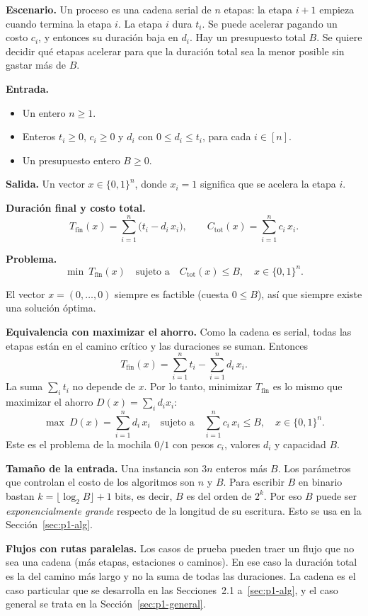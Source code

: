 \documentclass[11pt,a4paper]{article}
\theoremstyle{definition}
\newcommand{\Tfin}{T_{\mathrm{fin}}}
\newcommand{\Ctot}{C_{\mathrm{tot}}}
\begin{document}
\textbf{Escenario.} Un proceso es una cadena serial de $n$ etapas: la etapa $i+1$ empieza cuando termina la etapa $i$. La etapa $i$ dura $t_i$. Se puede acelerar pagando un costo $c_i$, y entonces su duración baja en $d_i$. Hay un presupuesto total $B$. Se quiere decidir qué etapas acelerar para que la duración total sea la menor posible sin gastar más de $B$.

\textbf{Entrada.}
\begin{itemize}[nosep]
  \item Un entero $n\ge 1$.
  \item Enteros $t_i\ge 0$, $c_i\ge 0$ y $d_i$ con $0\le d_i\le t_i$, para cada $i\in[n]$.
  \item Un presupuesto entero $B\ge 0$.
\end{itemize}

\textbf{Salida.} Un vector $x\in\{0,1\}^n$, donde $x_i=1$ significa que se acelera la etapa $i$.

\textbf{Duración final y costo total.}
\[
\Tfin(x)=\sum_{i=1}^{n}\bigl(t_i-d_i\,x_i\bigr),
\qquad
\Ctot(x)=\sum_{i=1}^{n}c_i\,x_i .
\]

\textbf{Problema.}
\[
\min\ \Tfin(x)\quad\text{sujeto a}\quad \Ctot(x)\le B,\quad x\in\{0,1\}^n .
\]

El vector $x=(0,\dots,0)$ siempre es factible (cuesta $0\le B$), así que siempre existe una solución óptima.

\textbf{Equivalencia con maximizar el ahorro.} Como la cadena es serial, todas las etapas están en el camino crítico y las duraciones se suman. Entonces
\[
\Tfin(x)=\sum_{i=1}^{n}t_i-\sum_{i=1}^{n}d_i\,x_i .
\]
La suma $\sum_i t_i$ no depende de $x$. Por lo tanto, minimizar $\Tfin$ es lo mismo que maximizar el ahorro $D(x)=\sum_i d_i x_i$:
\[
\max\ D(x)=\sum_{i=1}^{n}d_i\,x_i\quad\text{sujeto a}\quad \sum_{i=1}^{n}c_i\,x_i\le B,\quad x\in\{0,1\}^n .
\]
Este es el problema de la mochila $0/1$ con pesos $c_i$, valores $d_i$ y capacidad $B$.

\textbf{Tamaño de la entrada.} Una instancia son $3n$ enteros más $B$. Los parámetros que controlan el costo de los algoritmos son $n$ y $B$. Para escribir $B$ en binario bastan $k=\lfloor\log_2 B\rfloor+1$ bits, es decir, $B$ es del orden de $2^{k}$. Por eso $B$ puede ser \emph{exponencialmente grande} respecto de la longitud de su escritura. Esto se usa en la Sección~\ref{sec:p1-alg}.

\textbf{Flujos con rutas paralelas.} Los casos de prueba pueden traer un flujo que no sea una cadena (más etapas, estaciones o caminos). En ese caso la duración total es la del camino más largo y no la suma de todas las duraciones. La cadena es el caso particular que se desarrolla en las Secciones~2.1 a~\ref{sec:p1-alg}, y el caso general se trata en la Sección~\ref{sec:p1-general}.
\end{document}
